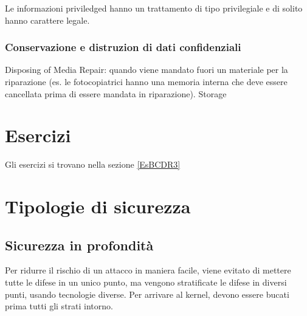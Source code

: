 
Le informazioni priviledged hanno un trattamento di tipo privilegiale e di
solito hanno carattere legale.

\subsubsection{Conservazione e distruzion di dati confidenziali}

Disposing of Media
Repair: quando viene mandato fuori un materiale per la riparazione (es. le
fotocopiatrici hanno una memoria interna che deve essere cancellata prima di
essere mandata in riparazione).
Storage

\section{Esercizi}

Gli esercizi si trovano nella sezione \ref{EsBCDR3}

\section{Tipologie di sicurezza}

\subsection{Sicurezza in profondità}

Per ridurre il rischio di un attacco in maniera facile, viene evitato di
mettere tutte le difese in un unico punto, ma vengono stratificate le difese in
diversi punti, usando tecnologie diverse.
Per arrivare al kernel, devono essere bucati prima tutti gli strati intorno.
